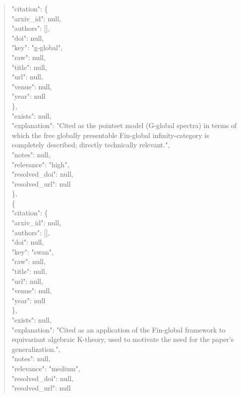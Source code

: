 \documentclass[11pt]{article}
\begin{document}
\begin{quote}
      "citation": \{\\
        "arxiv\_id": null,\\
        "authors": [],\\
        "doi": null,\\
        "key": "g-global",\\
        "raw": null,\\
        "title": null,\\
        "url": null,\\
        "venue": null,\\
        "year": null\\
      \},\\
      "exists": null,\\
      "explanation": "Cited as the pointset model (G-global spectra) in terms of which the free globally presentable Fin-global infinity-category is completely described; directly technically relevant.",\\
      "notes": null,\\
      "relevance": "high",\\
      "resolved\_doi": null,\\
      "resolved\_url": null\\
    \},\\
    \{\\
      "citation": \{\\
        "arxiv\_id": null,\\
        "authors": [],\\
        "doi": null,\\
        "key": "swan",\\
        "raw": null,\\
        "title": null,\\
        "url": null,\\
        "venue": null,\\
        "year": null\\
      \},\\
      "exists": null,\\
      "explanation": "Cited as an application of the Fin-global framework to equivariant algebraic K-theory, used to motivate the need for the paper's generalization.",\\
      "notes": null,\\
      "relevance": "medium",\\
      "resolved\_doi": null,\\
      "resolved\_url": null\\

\end{quote}
\end{document}

